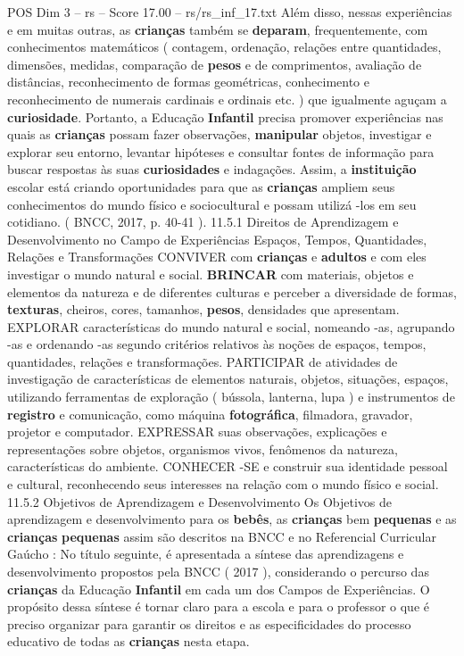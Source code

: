 \begin{textsample}{POS Dim 3 – rs – Score 17.00 – rs/rs\_inf\_17.txt}
Além disso, nessas experiências e em muitas outras, as \textbf{crianças} também se \textbf{deparam}, frequentemente, com conhecimentos matemáticos ( contagem, ordenação, relações entre quantidades, dimensões, medidas, comparação de \textbf{pesos} e de comprimentos, avaliação de distâncias, reconhecimento de formas geométricas, conhecimento e reconhecimento de numerais cardinais e ordinais etc. ) que igualmente aguçam a \textbf{curiosidade}.
Portanto, a Educação \textbf{Infantil} precisa promover experiências nas quais as \textbf{crianças} possam fazer observações, \textbf{manipular} objetos, investigar e explorar seu entorno, levantar hipóteses e consultar fontes de informação para buscar respostas às suas \textbf{curiosidades} e indagações.
Assim, a \textbf{instituição} escolar está criando oportunidades para que as \textbf{crianças} ampliem seus conhecimentos do mundo físico e sociocultural e possam utilizá -los em seu cotidiano. ( BNCC, 2017, p. 40-41 ). 11.5.1 Direitos de Aprendizagem e Desenvolvimento no Campo de Experiências Espaços, Tempos, Quantidades, Relações e Transformações CONVIVER com \textbf{crianças} e \textbf{adultos} e com eles investigar o mundo natural e social. \textbf{BRINCAR} com materiais, objetos e elementos da natureza e de diferentes culturas e perceber a diversidade de formas, \textbf{texturas}, cheiros, cores, tamanhos, \textbf{pesos}, densidades que apresentam.
EXPLORAR características do mundo natural e social, nomeando -as, agrupando -as e ordenando -as segundo critérios relativos às noções de espaços, tempos, quantidades, relações e transformações.
PARTICIPAR de atividades de investigação de características de elementos naturais, objetos, situações, espaços, utilizando ferramentas de exploração ( bússola, lanterna, lupa ) e instrumentos de \textbf{registro} e comunicação, como máquina \textbf{fotográfica}, filmadora, gravador, projetor e computador.
EXPRESSAR suas observações, explicações e representações sobre objetos, organismos vivos, fenômenos da natureza, características do ambiente.
CONHECER -SE e construir sua identidade pessoal e cultural, reconhecendo seus interesses na relação com o mundo físico e social. 11.5.2 Objetivos de Aprendizagem e Desenvolvimento Os Objetivos de aprendizagem e desenvolvimento para os \textbf{bebês}, as \textbf{crianças} bem \textbf{pequenas} e as \textbf{crianças} \textbf{pequenas} assim são descritos na BNCC e no Referencial Curricular Gaúcho : No título seguinte, é apresentada a síntese das aprendizagens e desenvolvimento propostos pela BNCC ( 2017 ), considerando o percurso das \textbf{crianças} da Educação \textbf{Infantil} em cada um dos Campos de Experiências.
O propósito dessa síntese é tornar claro para a escola e para o professor o que é preciso organizar para garantir os direitos e as especificidades do processo educativo de todas as \textbf{crianças} nesta etapa.

\end{textsample}

